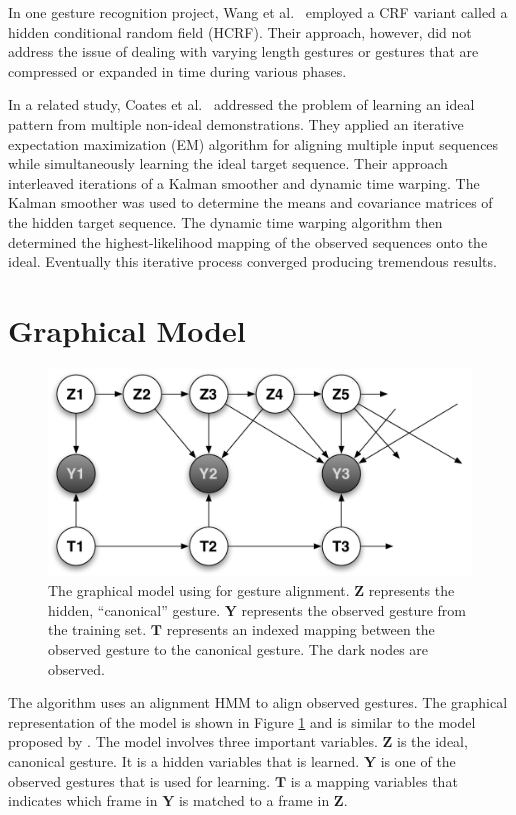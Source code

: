 \documentclass{article}
\begin{document}
In one gesture recognition project, Wang et al.\ \cite{Wang2006} employed a
CRF variant called a hidden conditional random field (HCRF). Their approach,
however, did not address the issue of dealing with varying length gestures or
gestures that are compressed or expanded in time during various phases.

In a related study, Coates et al.\ \cite{Coates2008} addressed the problem of
learning an ideal pattern from multiple non-ideal demonstrations. They applied
an iterative expectation maximization (EM) algorithm for aligning multiple input
sequences while simultaneously learning the ideal target sequence. Their
approach interleaved iterations of a Kalman smoother and dynamic time warping.
The Kalman smoother \cite{Muphy2002} was used to determine the means and
covariance matrices of the hidden target sequence. The dynamic time warping
algorithm \cite{Listgarten2005} then determined the highest-likelihood mapping
of the observed sequences onto the ideal. Eventually this iterative process
converged producing tremendous results.

\section{Graphical Model}

\begin{figure}
\begin{centering}
\includegraphics[width=0.65\columnwidth]{figures/model_tau_unobserved.pdf}

\caption{The graphical model using for gesture alignment. $\mathbf{Z}$
represents the hidden, ``canonical'' gesture. $\mathbf{Y}$ represents the
observed gesture from the training set. $\mathbf{T}$ represents an indexed
mapping between the observed gesture to the canonical gesture. The dark nodes
are observed. \label{figure:model_tau_unobserved}}

\end{centering}
\end{figure}


The algorithm uses an alignment HMM to align observed gestures. The graphical
representation of the model is shown in Figure \ref{figure:model_tau_unobserved}
and is similar to the model proposed by \cite{Coates2008}. The model involves
three important variables. $\mathbf{Z}$ is the ideal, canonical gesture. It is a
hidden variables that is learned. $\mathbf{Y}$ is one of the observed gestures
that is used for learning. $\mathbf{T}$ is a mapping variables that indicates
which frame in $\mathbf{Y}$ is matched to a frame in $\mathbf{Z}$.
\end{document}
